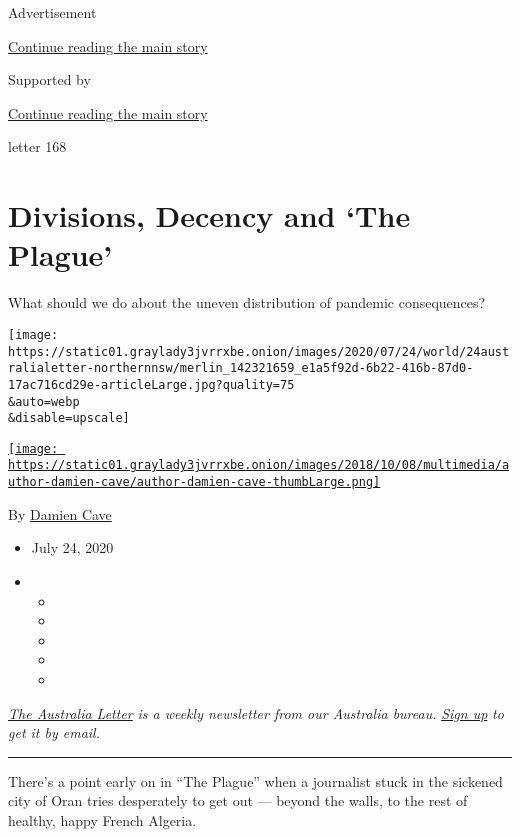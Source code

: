 Advertisement

\protect\hyperlink{after-top}{Continue reading the main story}

Supported by

\protect\hyperlink{after-sponsor}{Continue reading the main story}

letter 168

\hypertarget{divisions-decency-and-the-plague}{%
\section{Divisions, Decency and `The
Plague'}\label{divisions-decency-and-the-plague}}

What should we do about the uneven distribution of pandemic
consequences?

\texttt{[image: https://static01.graylady3jvrrxbe.onion/images/2020/07/24/world/24australialetter-northernnsw/merlin\_142321659\_e1a5f92d-6b22-416b-87d0-17ac716cd29e-articleLarge.jpg?quality=75\\\&auto=webp\\\&disable=upscale]}

\href{https://www.nytimes3xbfgragh.onion/by/damien-cave}{\texttt{[image: https://static01.graylady3jvrrxbe.onion/images/2018/10/08/multimedia/author-damien-cave/author-damien-cave-thumbLarge.png]}}

By \href{https://www.nytimes3xbfgragh.onion/by/damien-cave}{Damien Cave}

\begin{itemize}
\item
  July 24, 2020
\item
  \begin{itemize}
  \item
  \item
  \item
  \item
  \item
  \end{itemize}
\end{itemize}

\href{https://www.nytimes3xbfgragh.onion/series/nyt-australia-newsletter?module=inline}{\emph{The
Australia Letter}} \emph{is a weekly newsletter from our Australia
bureau.}
\href{https://www.nytimes3xbfgragh.onion/newsletters/australia-letter?module=inline}{\emph{Sign
up}} \emph{to get it by email.}

\begin{center}\rule{0.5\linewidth}{\linethickness}\end{center}

There's a point early on in ``The Plague'' when a journalist stuck in
the sickened city of Oran tries desperately to get out --- beyond the
walls, to the rest of healthy, happy French Algeria.

